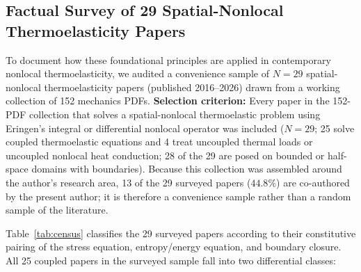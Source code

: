 \subsection{Factual Survey of 29 Spatial-Nonlocal Thermoelasticity Papers}\label{subsec:survey}

To document how these foundational principles are applied in contemporary nonlocal thermoelasticity, we audited a convenience sample of $N = 29$ spatial-nonlocal thermoelasticity papers (published 2016--2026) drawn from a working collection of 152 mechanics PDFs. \textbf{Selection criterion:} Every paper in the 152-PDF collection that solves a spatial-nonlocal thermoelastic problem using Eringen's integral or differential nonlocal operator was included ($N = 29$; 25 solve coupled thermoelastic equations and 4 treat uncoupled thermal loads or uncoupled nonlocal heat conduction; 28 of the 29 are posed on bounded or half-space domains with boundaries). Because this collection was assembled around the author's research area, 13 of the 29 surveyed papers ($44.8\%$) are co-authored by the present author; it is therefore a convenience sample rather than a random sample of the literature.

Table~\ref{tab:census} classifies the 29 surveyed papers according to their constitutive pairing of the stress equation, entropy/energy equation, and boundary closure. All 25 coupled papers in the surveyed sample fall into two differential classes:

